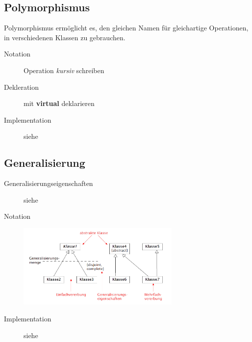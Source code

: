 \subsection{Polymorphismus }
  Polymorphismus ermöglicht es, den gleichen Namen für gleichartige Operationen,
  in verschiedenen Klassen zu gebrauchen.
  \begin{description}
    \item[]
    \item[Notation]
      Operation \textit{kursiv} schreiben
    \item[Dekleration]
      mit \textbf{virtual} deklarieren
    \item[Implementation]
      siehe 
  \end{description}
  
\subsection{Generalisierung }
  \begin{description}
    \item[Generalisierungseigenschaften]
      siehe 
    \item[Notation]
      \parbox{15cm}{\includegraphics[width=8cm]{./bilder/Notation_Generalisierung.png}}
    \item[Implementation]
      siehe 
  \end{description}
  


